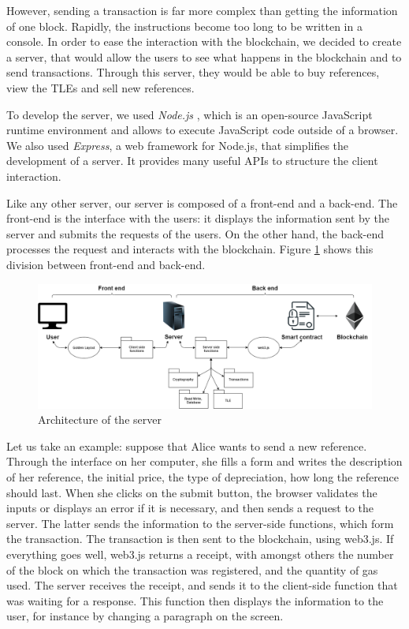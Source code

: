 \documentclass[conference]{IEEEtran}
\begin{document}
However, sending a transaction is far more complex than getting the information of one block. Rapidly, the instructions become too long to be written in a console. In order to ease the interaction with the blockchain, we decided to create a server, that would allow the users to see what happens in the blockchain and to send transactions. Through this server, they would be able to buy references, view the TLEs and sell new references.


To develop the server, we used \textit{Node.js} \cite{Nodejs}\cite{NodejsTutorial}, which is an open-source JavaScript runtime environment and allows to execute JavaScript code outside of a browser. We also used \textit{Express}\cite{Express}, a web framework for Node.js, that simplifies the development of a server. It provides many useful APIs to structure the client interaction.

Like any other server, our server is composed of a front-end and a back-end. The front-end is the interface with the users: it displays the information sent by the server and submits the requests of the users. On the other hand, the back-end processes the request and interacts with the blockchain. Figure \ref{fig:Front-end/back-end} shows this division between front-end and back-end.


\begin{figure}[ht]
\centering
\includegraphics[width=\linewidth]{server.png}
 \caption{Architecture of the server}
 \label{fig:Front-end/back-end}
\end{figure}


Let us take an example: suppose that Alice wants to send a new reference. Through the interface on her computer, she fills a form and writes the description of her reference, the initial price, the type of depreciation, how long the reference should last. When she clicks on the submit button, the browser validates the inputs or displays an error if it is necessary, and then sends a request to the server. The latter sends the information to the server-side functions, which form the transaction. The transaction is then sent to the blockchain, using web3.js. If everything goes well, web3.js returns a receipt, with amongst others the number of the block on which the transaction was registered, and the quantity of gas used. The server receives the receipt, and sends it to the client-side function that was waiting for a response. This function then displays the information to the user, for instance by changing a paragraph on the screen.
\end{document}
